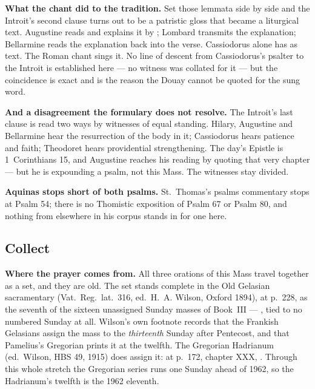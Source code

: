 \textbf{What the chant did to the tradition.} Set those lemmata side by side and
the Introit's second clause turns out to be a patristic gloss that became a
liturgical text. Augustine reads  and explains it by
; Lombard transmits the explanation; Bellarmine reads the
explanation back into the verse. Cassiodorus alone has  as
text. The Roman chant sings it. No line of descent from Cassiodorus's psalter
to the Introit is established here --- no  witness was
collated for it --- but the coincidence is exact and is the reason
the Douay cannot be quoted for the sung word.

\textbf{And a disagreement the formulary does not resolve.} The Introit's last
clause is read two ways by witnesses of equal standing. Hilary, Augustine and
Bellarmine hear the resurrection of the body in it; Cassiodorus hears patience
and faith; Theodoret hears providential strengthening. The day's Epistle is
1~Corinthians 15, and Augustine reaches his reading by quoting that very
chapter --- but he is expounding a psalm, not this Mass. The witnesses stay
divided.

\textbf{Aquinas stops short of both psalms.} St.~Thomas's psalms commentary stops at Psalm
54; there is no Thomistic exposition of Psalm 67 or Psalm 80, and nothing from
elsewhere in his corpus stands in for one here.

\elementguard
\subsection*{Collect }


\textbf{Where the prayer comes from.} All three orations of this Mass travel
together as a set, and they are old. The set stands complete in the Old
Gelasian sacramentary (Vat.~Reg.~lat.~316, ed.\ H.~A. Wilson, Oxford 1894), at
p.~228, as the seventh of the sixteen unassigned Sunday masses of Book~III ---
, tied to no numbered Sunday at all. Wilson's own
footnote records that the Frankish Gelasians assign the mass to the
\textit{thirteenth} Sunday after Pentecost, and that Pamelius's Gregorian
prints it at the twelfth. The Gregorian Hadrianum (ed.\ Wilson, HBS 49, 1915)
does assign it: at p.~172, chapter XXX, . Through this whole stretch the Gregorian series runs one Sunday
ahead of 1962, so the Hadrianum's twelfth is the 1962 eleventh.

